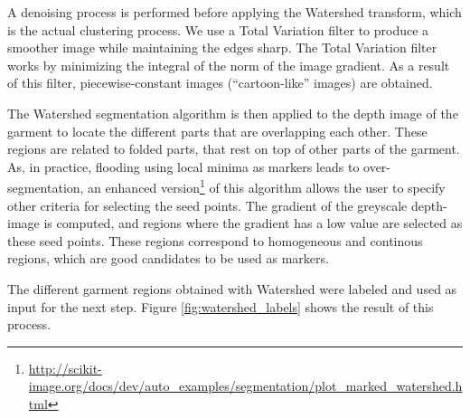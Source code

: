 A denoising process is performed before applying the Watershed transform, which is the actual clustering process. We use a Total Variation filter  to produce a smoother image while maintaining the edges sharp. The Total Variation filter works by minimizing the integral of the norm of the image gradient. As a result of this filter, piecewise-constant images (``cartoon-like'' images) are obtained.

The Watershed segmentation algorithm is then applied to the depth image of the garment to locate the different parts that are overlapping each other. These regions are related to folded parts, that rest on top of other parts of the garment. 
%
As, in practice, flooding using local minima as markers  leads to over-segmentation, an enhanced version\footnote{\url{http://scikit-image.org/docs/dev/auto_examples/segmentation/plot_marked_watershed.html}} of this algorithm  allows the user to specify other criteria for selecting the seed points. The gradient of the greyscale depth-image is computed, and regions where the gradient has a low value are selected as these seed points. These regions correspond to homogeneous and continous regions, which are good candidates to be used as markers.

The different garment regions obtained with Watershed were labeled and used as input for the next step. Figure \ref{fig:watershed_labels} shows the result of this process.


